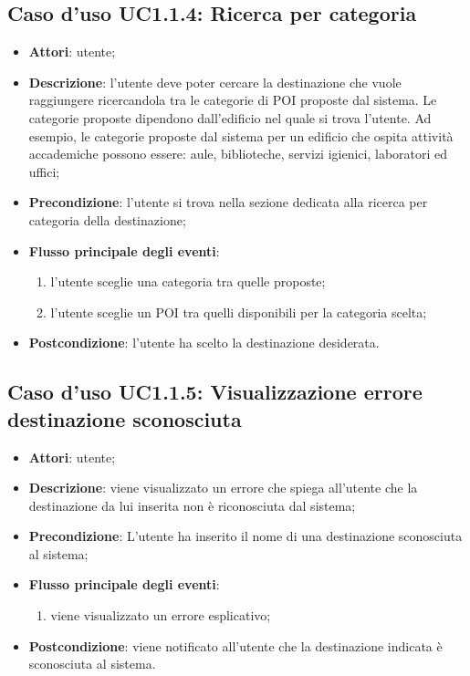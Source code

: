 \documentclass[../AnalisiDeiRequisiti.tex]{subfiles}
\begin{document}
\subsection{Caso d'uso UC1.1.4: Ricerca per categoria}
\begin{itemize}
\item \textbf{Attori}: utente;
\item \textbf{Descrizione}: l'utente deve poter cercare la destinazione che vuole raggiungere ricercandola tra le categorie di POI proposte dal sistema. Le categorie proposte dipendono dall'edificio nel quale si trova l'utente. Ad esempio, le categorie proposte dal sistema per un edificio che ospita attività accademiche possono essere: aule, biblioteche, servizi igienici, laboratori ed uffici; 
      \item \textbf{Precondizione}: l'utente si trova nella sezione dedicata alla ricerca per categoria della destinazione;

        \item \textbf{Flusso principale degli eventi}:
          \begin{enumerate}
          \item l'utente sceglie una categoria tra quelle proposte;
          \item l'utente sceglie un POI tra quelli disponibili per la categoria scelta;

      \end{enumerate}
    \item \textbf{Postcondizione}: l'utente ha scelto la destinazione desiderata.
  \end{itemize}
\hypertarget{UC1.1.5}{}
\subsection{Caso d'uso UC1.1.5: Visualizzazione errore destinazione sconosciuta}
\begin{itemize}
\item \textbf{Attori}: utente;
\item \textbf{Descrizione}: viene visualizzato un errore che spiega all’utente che la destinazione da lui inserita non è riconosciuta dal sistema;
      \item \textbf{Precondizione}: L'utente ha inserito il nome di una destinazione sconosciuta al sistema;

        \item \textbf{Flusso principale degli eventi}:
          \begin{enumerate}
          \item viene visualizzato un errore esplicativo;

      \end{enumerate}
    \item \textbf{Postcondizione}: viene notificato all'utente che la destinazione indicata è sconosciuta al sistema.
  \end{itemize}
\hypertarget{UC1.2}{}
\end{document}
